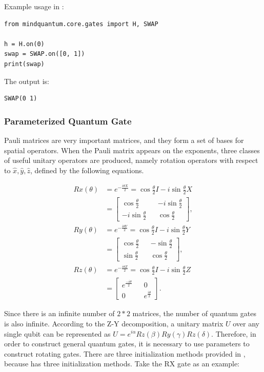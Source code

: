Example usage in \MindQuantum:
\begin{lstlisting}
from mindquantum.core.gates import H, SWAP

h = H.on(0)
swap = SWAP.on([0, 1])
print(swap)
\end{lstlisting}
The output is:
\begin{lstlisting}
SWAP(0 1)
\end{lstlisting}

\subsubsection{Parameterized Quantum Gate}
Pauli matrices are very important matrices, and they form a set of bases for spatial operators. When the Pauli matrix appears on the exponents, three classes of useful unitary operators are produced, namely rotation operators with respect to $\hat{x}, \hat{y}, \hat{z}$, defined by the following equations.

\begin{align*}
    Rx(\theta) & =
    e^{-\frac{i\theta X}{2}}=
    \cos{\frac{\theta}{2}}I-i\sin{\frac{\theta}{2}}X \\
               & =\begin{bmatrix}
        \cos{\frac{\theta}{2}}   &  & -i\sin{\frac{\theta}{2}} \\
        -i\sin{\frac{\theta}{2}} &  & \cos{\frac{\theta}{2}}
    \end{bmatrix},        \\
    Ry(\theta) & =
    e^{-\frac{i\theta Y}{2}}=
    \cos{\frac{\theta}{2}}I-i\sin{\frac{\theta}{2}}Y \\
               & =    \begin{bmatrix}
        \cos{\frac{\theta}{2}} &  & -\sin{\frac{\theta}{2}} \\
        \sin{\frac{\theta}{2}} &  & \cos{\frac{\theta}{2}}
    \end{bmatrix},    \\
    Rz(\theta) & =
    e^{-\frac{i\theta Z}{2}}=
    \cos{\frac{\theta}{2}}I-i\sin{\frac{\theta}{2}}Z \\
               & =    \begin{bmatrix}
        e^{\frac{-i\theta}{2}} &  & 0                     \\
        0                      &  & e^{\frac{i\theta}{2}}
    \end{bmatrix}.
\end{align*}


Since there is an infinite number of $2*2$ matrices, the number of quantum gates is also infinite. According to the Z-Y decomposition, a unitary matrix $U$ over any single qubit can be represented as $U=e^{i\alpha}Rz(\beta)Ry(\gamma)Rz(\delta)$. Therefore, in order to construct general quantum gates, it is necessary to use parameters to construct rotating gates. There are three initialization methods provided in \MindQuantum, because \ParameterResolver has three initialization methods. Take the RX gate as an example:

